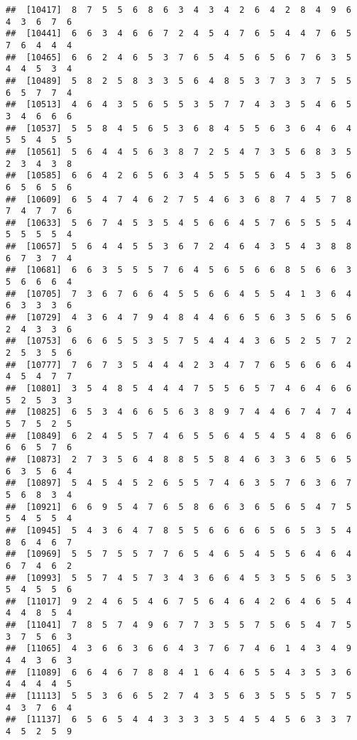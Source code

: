 \documentclass[
]{book}
\begin{document}
\begin{verbatim}
##  [10417]  8  7  5  5  6  8  6  3  4  3  4  2  6  4  2  8  4  9  6  4  3  6  7  6
##  [10441]  6  6  3  4  6  6  7  2  4  5  4  7  6  5  4  4  7  6  5  7  6  4  4  4
##  [10465]  6  6  2  4  6  5  3  7  6  5  4  5  6  5  6  7  6  3  5  4  4  5  3  4
##  [10489]  5  8  2  5  8  3  3  5  6  4  8  5  3  7  3  3  7  5  5  6  5  7  7  4
##  [10513]  4  6  4  3  5  6  5  5  3  5  7  7  4  3  3  5  4  6  5  3  4  6  6  6
##  [10537]  5  5  8  4  5  6  5  3  6  8  4  5  5  6  3  6  4  6  4  5  5  4  5  5
##  [10561]  5  6  4  4  5  6  3  8  7  2  5  4  7  3  5  6  8  3  5  2  3  4  3  8
##  [10585]  6  6  4  2  6  5  6  3  4  5  5  5  5  6  4  5  3  5  6  6  5  6  5  6
##  [10609]  6  5  4  7  4  6  2  7  5  4  6  3  6  8  7  4  5  7  8  7  4  7  7  6
##  [10633]  5  6  7  4  5  3  5  4  5  6  6  4  5  7  6  5  5  5  4  5  5  5  5  4
##  [10657]  5  6  4  4  5  5  3  6  7  2  4  6  4  3  5  4  3  8  8  6  7  3  7  4
##  [10681]  6  6  3  5  5  5  7  6  4  5  6  5  6  6  8  5  6  6  3  5  6  6  6  4
##  [10705]  7  3  6  7  6  6  4  5  5  6  6  4  5  5  4  1  3  6  4  6  3  3  3  6
##  [10729]  4  3  6  4  7  9  4  8  4  4  6  6  5  6  3  5  6  5  6  2  4  3  3  6
##  [10753]  6  6  6  5  5  3  5  7  5  4  4  4  3  6  5  2  5  7  2  2  5  3  5  6
##  [10777]  7  6  7  3  5  4  4  4  2  3  4  7  7  6  5  6  6  6  4  4  5  4  7  7
##  [10801]  3  5  4  8  5  4  4  4  7  5  5  6  5  7  4  6  4  6  6  5  2  5  3  3
##  [10825]  6  5  3  4  6  6  5  6  3  8  9  7  4  4  6  7  4  7  4  5  7  5  2  5
##  [10849]  6  2  4  5  5  7  4  6  5  5  6  4  5  4  5  4  8  6  6  6  6  5  7  6
##  [10873]  2  7  3  5  6  4  8  8  5  5  8  4  6  3  3  6  5  6  5  6  3  5  6  4
##  [10897]  5  4  5  4  5  2  6  5  5  7  4  6  3  5  7  6  3  6  7  5  6  8  3  4
##  [10921]  6  6  9  5  4  7  6  5  8  6  6  3  6  5  6  5  4  7  5  5  4  5  5  4
##  [10945]  5  4  3  6  4  7  8  5  5  6  6  6  6  5  6  5  3  5  4  8  6  4  6  7
##  [10969]  5  5  7  5  5  7  7  6  5  4  6  5  4  5  5  6  4  6  4  6  7  4  6  2
##  [10993]  5  5  7  4  5  7  3  4  3  6  6  4  5  3  5  5  6  5  3  5  4  5  5  6
##  [11017]  9  2  4  6  5  4  6  7  5  6  4  6  4  2  6  4  6  5  4  4  4  8  5  4
##  [11041]  7  8  5  7  4  9  6  7  7  3  5  5  7  5  6  5  4  7  5  3  7  5  6  3
##  [11065]  4  3  6  6  3  6  6  4  3  7  6  7  4  6  1  4  3  4  9  4  4  3  6  3
##  [11089]  6  6  4  6  7  8  8  4  1  6  4  6  5  5  4  3  5  3  6  4  4  4  4  5
##  [11113]  5  5  3  6  6  5  2  7  4  3  5  6  3  5  5  5  5  7  5  4  3  7  6  4
##  [11137]  6  5  6  5  4  4  3  3  3  3  5  4  5  4  5  6  3  3  7  4  5  2  5  9

\end{verbatim}
\end{document}
